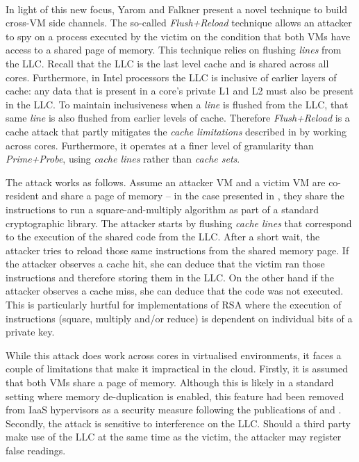 \documentclass[orivec,envcountsame, a4paper, 11pt]{llncs}
\begin{document}
\paragraph{} In light of this new focus, Yarom and Falkner \cite{Yarom2014} present a novel technique to build cross-VM side channels. The so-called \textit{Flush+Reload} technique allows an attacker to spy on a process executed by the victim on the condition that both VMs have access to a shared page of memory. This technique relies on flushing \textit{lines} from the LLC. Recall that the LLC is the last level cache and is shared across all cores. Furthermore, in Intel processors the LLC is inclusive of earlier layers of cache: any data that is present in a core's private L1 and L2 must also be present in the LLC. To maintain inclusiveness when a \textit{line} is flushed from the LLC, that same \textit{line} is also flushed from earlier levels of cache. Therefore \textit{Flush+Reload} is a cache attack that partly mitigates the \textit{cache limitations} described in \cite{Wu2012} by working across cores. Furthermore, it operates at a finer level of granularity than \textit{Prime+Probe}, using \textit{cache lines} rather than \textit{cache sets}.

The attack works as follows. Assume an attacker VM and a victim VM are co-resident and share a page of memory -- in the case presented in \cite{Yarom2014}, they share the instructions to run a square-and-multiply algorithm as part of a standard cryptographic library. The attacker starts by flushing \textit{cache lines} that correspond to the execution of the shared code from the LLC. After a short wait, the attacker tries to reload those same instructions from the shared memory page. If the attacker observes a cache hit, she can deduce that the victim ran those instructions and therefore storing them in the LLC. On the other hand if the attacker observes a cache miss, she can deduce that the code was not executed. This is particularly hurtful for implementations of RSA where the execution of instructions (square, multiply and/or reduce) is dependent on individual bits of a private key.

While this attack does work across cores in virtualised environments, it faces a couple of limitations that make it impractical in the cloud. Firstly, it is assumed that both VMs share a page of memory. Although this is likely in a standard setting where memory de-duplication is enabled, this feature had been removed from IaaS hypervisors as a security measure following the publications of \cite{Suzaki2011} and \cite{Xiao2013}. Secondly, the attack is sensitive to interference on the LLC. Should a third party make use of the LLC at the same time as the victim, the attacker may register false readings.
\end{document}
